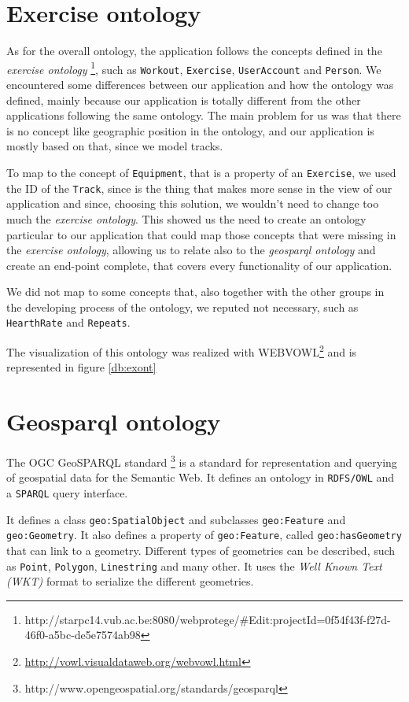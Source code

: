 \documentclass[11pt,a4paper]{scrreprt}
\begin{document}
\section{Exercise ontology}
As for the overall ontology, the application follows the concepts defined in the \textit{exercise ontology} \footnote{http://starpc14.vub.ac.be:8080/webprotege/\#Edit:projectId=0f54f43f-f27d-46f0-a5bc-de5e7574ab98}, such as \texttt{Workout}, \texttt{Exercise}, \texttt{UserAccount} and \texttt{Person}. 
We encountered some differences between our application and how the ontology was defined, mainly because our application is totally different from the other applications following the same ontology. The main problem for us was that there is no concept like geographic position in the ontology, and our application is mostly based on that, since we model tracks. 

To map to the concept of \texttt{Equipment}, that is a property of an \texttt{Exercise}, we used the ID of the \texttt{Track}, since is the thing that makes more sense in the view of our application and since, choosing this solution, we wouldn't need to change too much the \textit{exercise ontology}. 
This showed us the need to create an ontology particular to our application that could map those concepts that were missing in the \textit{exercise ontology}, allowing us to relate also to the \textit{geosparql ontology} and create an end-point complete, that covers every functionality of our application.

We did not map to some concepts that, also together with the other groups in the developing process of the ontology, we reputed not necessary, such as \texttt{HearthRate} and \texttt{Repeats}.

The visualization of this ontology was realized with WEBVOWL\footnote{\url{http://vowl.visualdataweb.org/webvowl.html}} and is represented in figure \ref{db:exont}
\section{Geosparql ontology}
The OGC GeoSPARQL standard \footnote{http://www.opengeospatial.org/standards/geosparql} is a standard for representation and querying of geospatial data for the Semantic Web. It defines an ontology in \texttt{RDFS/OWL} and a \texttt{SPARQL} query interface.

It defines a class \texttt{geo:SpatialObject} and subclasses \texttt{geo:Feature} and \texttt{geo:Geometry}. It also defines a property of \texttt{geo:Feature}, called \texttt{geo:hasGeometry} that can link to a geometry.
Different types of geometries can be described, such as \texttt{Point}, \texttt{Polygon}, \texttt{Linestring} and many other.
It uses the \textit{Well Known Text (WKT)} format to serialize the different geometries.
\end{document}
